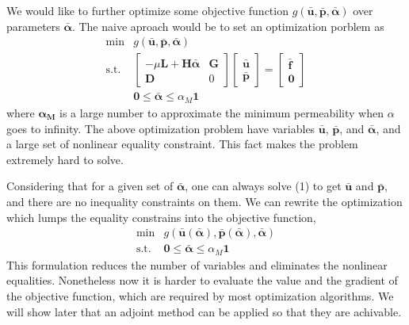 \documentclass{article}
\begin{document}
We would like to further optimize some objective function $g(\mathbf{\bar{u}},\mathbf{\bar{p}},\mathbf{\bar{\alpha}})$ over parameters $\mathbf{\bar{\alpha}}$. The naive aproach would be to set an optimization porblem as
\begin{eqnarray*}
  \mbox{min} & g(\mathbf{\bar{u}},\mathbf{\bar{p}},\mathbf{\bar{\alpha}}) \\
  \mbox{s.t.}&  
	\left[\begin{matrix}
 	 -\mu \mathbf{L} + \mathbf{H} \mathbf{\bar{\alpha}}  & \mathbf{G}\\
 	  \mathbf{D}               &  0 
	\end{matrix} \right]
	\left[\begin{matrix}
	  \mathbf{\bar{u}} \\ \mathbf{\bar{p}}
	\end{matrix} \right]= 
	\left[\begin{matrix}
 	 \mathbf{\bar{f}} \\ \mathbf{0}
	\end{matrix} \right] \\
  & \mathbf{0}\le \mathbf{\bar{\alpha}} \le \alpha_M\mathbf{1}  
\end{eqnarray*}
where $\mathbf{\alpha_M}$ is a large number to approximate the minimum permeability when $\alpha$ goes to infinity. The above optimization problem have variables $\mathbf{\bar{u}}$, $\mathbf{\bar{p}}$, and $\mathbf{\bar{\alpha}}$, and a large set of nonlinear equality constraint. This fact makes the problem extremely hard to solve.

Considering that for a given set of $\mathbf{\bar{\alpha}}$, one can always solve (1) to get $\mathbf{\bar{u}}$ and $\mathbf{\bar{p}}$, and there are no inequality constraints on them. We can rewrite the optimization which lumps the equality constrains into the objective function,
\begin{eqnarray*}
   \mbox{min}  & g(\mathbf{\bar{u}(\mathbf{\bar{\alpha}})},\mathbf{\bar{p}(\mathbf{\bar{\alpha}})},\mathbf{\bar{\alpha}}) \\
   \mbox{s.t.} & \mathbf{0}\le \mathbf{\bar{\alpha}} \le \alpha_M\mathbf{1}  
\end{eqnarray*}
This formulation reduces the number of variables and eliminates the nonlinear equalities. Nonetheless now it is harder to evaluate the value and the gradient of the objective function, which are required by most optimization algorithms. We will show later that an adjoint method can be applied so that they are achivable.   
 
\end{document}
